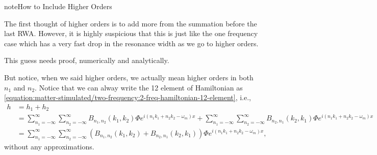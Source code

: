 \documentclass[letterpaper,12pt,english]{sphinxmanual}
\begin{document}
\begin{sphinxadmonition}{note}{How to Include Higher Orders}

The first thought of higher orders is to add more from the summation before the last RWA. However, it is highly suspicious that this is just like the one frequency case which has a very fast drop in the resonance width as we go to higher orders.

This guess needs proof, numerically and analytically.

But notice, when we said higher orders, we actually mean higher orders in both \(n_1\) and \(n_2\). Notice that we can alway write the 12 element of Hamiltonian as \eqref{equation:matter-stimulated/two-frequency:2-freq-hamiltonian-12-element}, i.e.,
\begin{equation*}
\begin{split}h &= h_1 + h_2 \\
& = \sum_{n_1=-\infty}^\infty \sum_{n_2=-\infty}^{\infty} B_{n_1,n_2}(k_1,k_2) \Phi e^{i(n_1 k_1 + n_2 k_2 - \omega_m)x} +  \sum_{n_1=-\infty}^\infty \sum_{n_2=-\infty}^{\infty} B_{n_2,n_1}(k_2,k_1) \Phi e^{i(n_1 k_1 + n_2 k_2 - \omega_m)x} \\
& = \sum_{n_1=-\infty}^\infty \sum_{n_2=-\infty}^{\infty} \left( B_{n_1,n_2}(k_1,k_2) + B_{n_2,n_1}(k_2,k_1) \right) \Phi e^{i(n_1 k_1 + n_2 k_2 - \omega_m)x},\end{split}
\end{equation*}
without any approximations.
\end{sphinxadmonition}
\end{document}
